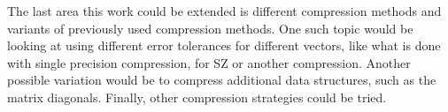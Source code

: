 The last area this work could be extended is different compression methods and variants of previously used compression methods.
One such topic would be looking at using different error tolerances for different vectors, like what is done with single precision compression, for SZ or another compression.
Another possible variation would be to compress additional data structures, such as the matrix diagonals.
Finally, other compression strategies could be tried.

